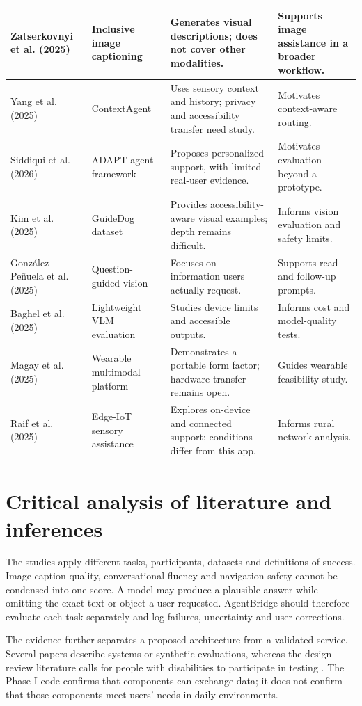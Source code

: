 \documentclass[12pt,a4paper,oneside]{report}
\begin{document}
\begin{longtable}{|>{\raggedright\arraybackslash}p{}|>{\raggedright\arraybackslash}p{}|>{\raggedright\arraybackslash}p{}|>{\raggedright\arraybackslash}p{}|}
Zatserkovnyi et al. (2025) \cite{zatserkovnyi} & Inclusive image captioning & Generates visual descriptions; does not cover other modalities. & Supports image assistance in a broader workflow.\\\hline
Yang et al. (2025) \cite{yang} & ContextAgent & Uses sensory context and history; privacy and accessibility transfer need study. & Motivates context-aware routing.\\\hline
Siddiqui et al. (2026) \cite{siddiqui} & ADAPT agent framework & Proposes personalized support, with limited real-user evidence. & Motivates evaluation beyond a prototype.\\\hline
Kim et al. (2025) \cite{kim} & GuideDog dataset & Provides accessibility-aware visual examples; depth remains difficult. & Informs vision evaluation and safety limits.\\\hline
Gonz\'alez Pe\~nuela et al. (2025) \cite{penuela} & Question-guided vision & Focuses on information users actually request. & Supports read and follow-up prompts.\\\hline
Baghel et al. (2025) \cite{baghel} & Lightweight VLM evaluation & Studies device limits and accessible outputs. & Informs cost and model-quality tests.\\\hline
Magay et al. (2025) \cite{magay} & Wearable multimodal platform & Demonstrates a portable form factor; hardware transfer remains open. & Guides wearable feasibility study.\\\hline
Raif et al. (2025) \cite{raif} & Edge-IoT sensory assistance & Explores on-device and connected support; conditions differ from this app. & Informs rural network analysis.\\\hline
\end{longtable}\endgroup

\section{Critical analysis of literature and inferences}
The studies apply different tasks, participants, datasets and definitions of success. Image-caption quality, conversational fluency and navigation safety cannot be condensed into one score. A model may produce a plausible answer while omitting the exact text or object a user requested. AgentBridge should therefore evaluate each task separately and log failures, uncertainty and user corrections.

The evidence further separates a proposed architecture from a validated service. Several papers describe systems or synthetic evaluations, whereas the design-review literature calls for people with disabilities to participate in testing \cite{xu,jan,siddiqui}. The Phase-I code confirms that components can exchange data; it does not confirm that those components meet users' needs in daily environments.
\end{document}
